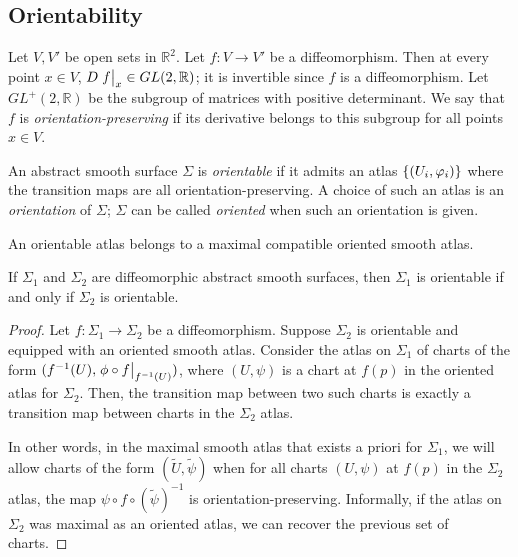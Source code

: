 \subsection{Orientability}
\begin{definition}
	Let \( V, V' \) be open sets in \( \mathbb R^2 \).
	Let \( f \colon V \to V' \) be a diffeomorphism.
	Then at every point \( x \in V \), \( D\eval{f}_x \in GL(2,\mathbb R) \); it is invertible since \( f \) is a diffeomorphism.
	Let \( GL^+(2,\mathbb R) \) be the subgroup of matrices with positive determinant.
	We say that \( f \) is \textit{orientation-preserving} if its derivative belongs to this subgroup for all points \( x \in V \).
\end{definition}
\begin{definition}
	An abstract smooth surface \( \Sigma \) is \textit{orientable} if it admits an atlas \( \qty{(U_i, \varphi_i)} \) where the transition maps are all orientation-preserving.
	A choice of such an atlas is an \textit{orientation} of \( \Sigma \); \( \Sigma \) can be called \textit{oriented} when such an orientation is given.
\end{definition}
\begin{remark}
	An orientable atlas belongs to a maximal compatible oriented smooth atlas.
\end{remark}
\begin{lemma}
	If \( \Sigma_1 \) and \( \Sigma_2 \) are diffeomorphic abstract smooth surfaces, then \( \Sigma_1 \) is orientable if and only if \( \Sigma_2 \) is orientable.
\end{lemma}
\begin{proof}
	Let \( f \colon \Sigma_1 \to \Sigma_2 \) be a diffeomorphism.
	Suppose \( \Sigma_2 \) is orientable and equipped with an oriented smooth atlas.
	Consider the atlas on \( \Sigma_1 \) of charts of the form \( (f^{-1}(U), \eval{\phi \circ f}_{f^{-1}(U)}) \), where \( (U, \psi) \) is a chart at \( f(p) \) in the oriented atlas for \( \Sigma_2 \).
	Then, the transition map between two such charts is exactly a transition map between charts in the \( \Sigma_2 \) atlas.

	In other words, in the maximal smooth atlas that exists a priori for \( \Sigma_1 \), we will allow charts of the form \( (\widetilde U, \widetilde \psi) \) when for all charts \( (U, \psi) \) at \( f(p) \) in the \( \Sigma_2 \) atlas, the map \( \psi \circ f \circ (\widetilde \psi)^{-1} \) is orientation-preserving.
	Informally, if the atlas on \( \Sigma_2 \) was maximal as an oriented atlas, we can recover the previous set of charts.
\end{proof}
